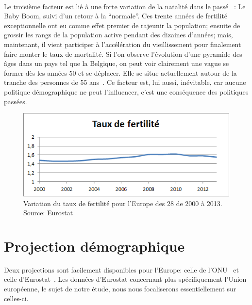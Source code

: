 \paragraph{}Le troisième facteur est lié à une forte variation de la natalité dans le passé~\citep[pp.2]{heran} : Le Baby Boom, suivi d'un retour à la “normale”. Ces trente années de fertilité exceptionnelle ont eu comme effet premier de rajeunir la population; ensuite de grossir les rangs de la population active pendant des dizaines d’années; mais, maintenant, il vient participer à l’accélération du vieillissement pour finalement faire monter le taux de mortalité. Si l'on observe l’évolution d’une pyramide des âges dans un pays tel que la Belgique, on peut voir clairement une vague se former dès les années 50 et se déplacer. Elle se situe actuellement autour de la tranche des personnes de 55 ans~\citep{pyramide-be}. Ce facteur est, lui aussi, inévitable, car aucune politique démographique ne peut l’influencer, c’est une conséquence des politiques passées.

\begin{figure}[h!]
    \begin{center}
        \includegraphics[scale=1]{document/fertilite_eu.png}
        \caption{Variation du taux de fertilité pour l'Europe des 28 de 2000 à 2013.  Source: Eurostat~\citep{eurostat_fecondite}}
        \label{fertilite_eu}
    \end{center}
\end{figure}

\section{Projection démographique}
\paragraph{}Deux projections sont facilement disponibles pour l’Europe: celle de l’ONU~\citep{onu} et celle d’Eurostat~\citep{eurostat_europop13}. Les données d’Eurostat concernant plus spécifiquement l’Union européenne, le sujet de notre étude, nous nous focaliserons essentiellement sur celles-ci.  

